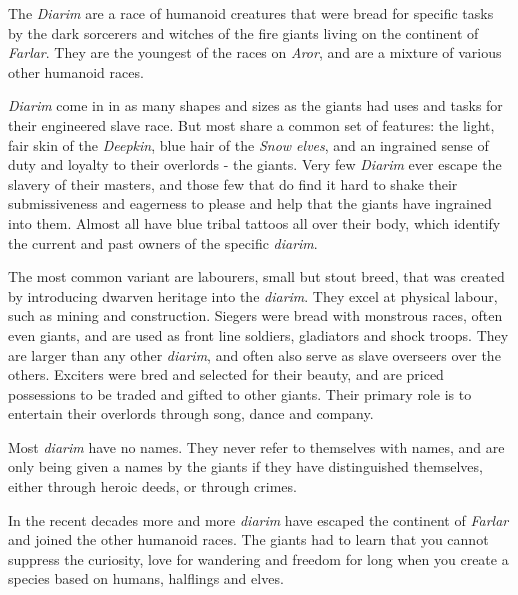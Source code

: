 
The \emph{Diarim} are a race of humanoid creatures that were bread for
specific tasks by the dark sorcerers and witches of the fire giants living on
the continent of \emph{Farlar}. They are the youngest of the races
on \emph{Aror}, and are a mixture of various other humanoid races.

\emph{Diarim} come in in as many shapes and sizes as the giants had uses and
tasks for their engineered slave race. But most share a common set of features:
the light, fair skin of the \emph{Deepkin}, blue hair of the \emph{Snow elves},
and an ingrained sense of duty and loyalty to their overlords - the giants. Very
few \emph{Diarim} ever escape the slavery of their masters, and those few that
do find it hard to shake their submissiveness and eagerness to please and help
that the giants have ingrained into them. Almost all have blue tribal tattoos
all over their body, which identify the current and past owners of the specific
\emph{diarim}.

The most common variant are labourers, small but stout breed, that was created
by introducing dwarven heritage into the \emph{diarim}. They excel at physical
labour, such as mining and construction. Siegers were bread with monstrous
races, often even giants, and are used as front line soldiers, gladiators and
shock troops. They are larger than any other \emph{diarim}, and often also
serve as slave overseers over the others. Exciters were bred and selected for
their beauty, and are priced possessions to be traded and gifted to other
giants. Their primary role is to entertain their overlords through song, dance
and company.

Most \emph{diarim} have no names. They never refer to themselves with names,
and are only being given a names by the giants if they have distinguished
themselves, either through heroic deeds, or through crimes.

In the recent decades more and more \emph{diarim} have escaped the continent
of \emph{Farlar} and joined the other humanoid races. The giants had to learn
that you cannot suppress the curiosity, love for wandering and freedom for long
when you create a species based on humans, halflings and elves.

